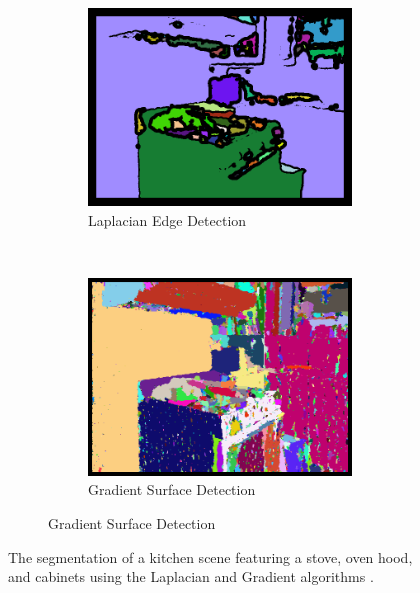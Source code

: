 \begin{figure}[t]
\vspace{.1in}

\begin{subfigure}{\textwidth}
    \centering
    \begin{subfigure}[t]{0.5\textwidth}
        \centering
        \includegraphics[height=.7\textwidth]{figs/Laplacian321.png}
        \caption{Laplacian Edge Detection}
        \label{fig:results:laplacian}
    \end{subfigure}%
    ~ 
    \begin{subfigure}[t]{0.5\textwidth}
        \centering
        \includegraphics[height=.7\textwidth]{figs/Gradient321.png}
        \caption{Gradient Surface Detection}
        \label{fig:results:gradient}
    \end{subfigure}
\end{subfigure}
\caption{The segmentation of a kitchen scene featuring a stove, oven hood, and cabinets using the Laplacian and Gradient algorithms \cite{kinect}.}
\end{figure}

